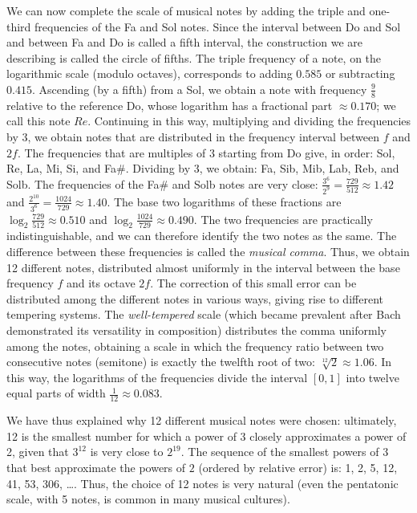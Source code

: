 We can now complete the scale of musical notes by adding the triple and
one-third frequencies of the Fa and Sol notes. Since the interval between Do and
Sol and between Fa and Do is called a fifth interval, the construction we are
describing is called the circle of fifths. The triple frequency of a note, on
the logarithmic scale (modulo octaves), corresponds to adding $0.585$ or
subtracting $0.415$. Ascending (by a fifth) from a Sol, we obtain a note with
frequency $\frac 9 8$ relative to the reference Do, whose logarithm has a
fractional part $\approx 0.170$; we call this note $Re$. Continuing in this way,
multiplying and dividing the frequencies by $3$, we obtain notes that are
distributed in the frequency interval between $f$ and $2f$. The frequencies that
are multiples of $3$ starting from Do give, in order: Sol, Re, La, Mi, Si, and
Fa\#. Dividing by 3, we obtain: Fa, Sib, Mib, Lab, Reb, and Solb. The
frequencies of the Fa\# and Solb notes are very close: $\frac{3^6}{2^9} =
\frac{729}{512} \approx 1.42$ and $\frac{2^{10}}{3^6} = \frac{1024}{729} \approx
1.40$. The base two logarithms of these fractions are $\log_2 \frac{729}{512}
\approx 0.510$ and $\log_2 \frac{1024}{729} \approx 0.490$. The two frequencies
are practically indistinguishable, and we can therefore identify the two notes
as the same. The difference between these frequencies is called the
\emph{musical comma}. Thus, we obtain 12 different notes, distributed almost
uniformly in the interval between the base frequency $f$ and its octave $2f$.
The correction of this small error can be distributed among the different notes
in various ways, giving rise to different tempering systems. The
\emph{well-tempered} scale (which became prevalent after Bach demonstrated its
versatility in composition) distributes the comma uniformly among the notes,
obtaining a scale in which the frequency ratio between two consecutive notes
(semitone) is exactly the twelfth root of two: $\sqrt[12]{2}\approx 1.06$. In
this way, the logarithms of the frequencies divide the interval $[0,1]$ into
twelve equal parts of width $\frac 1 {12} \approx 0.083$.

We have thus explained why 12 different musical notes were chosen: ultimately,
12 is the smallest number for which a power of 3 closely approximates a power of
2, given that $3^{12}$ is very close to $2^{19}$. The sequence of the smallest
powers of $3$ that best approximate the powers of $2$ (ordered by relative
error) is: 1, 2, 5, 12, 41, 53, 306, \dots. Thus, the choice of 12 notes is very
natural (even the pentatonic scale, with 5 notes, is common in many musical
cultures).

